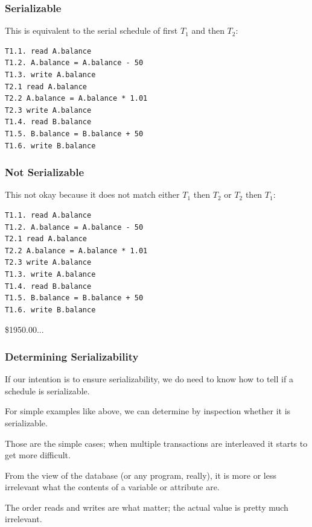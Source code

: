 \begin{frame}[fragile]
\frametitle{Serializable}

This is equivalent to the serial schedule of first $T_{1}$ and then $T_{2}$:

\begin{verbatim}
T1.1. read A.balance
T1.2. A.balance = A.balance - 50
T1.3. write A.balance
T2.1 read A.balance
T2.2 A.balance = A.balance * 1.01
T2.3 write A.balance
T1.4. read B.balance
T1.5. B.balance = B.balance + 50
T1.6. write B.balance
\end{verbatim}

\end{frame}

\begin{frame}[fragile]
\frametitle{Not Serializable}

This not okay because it does not match either $T_{1}$ then $T_{2}$ or $T_{2}$ then $T_{1}$:

\begin{verbatim}
T1.1. read A.balance
T1.2. A.balance = A.balance - 50
T2.1 read A.balance
T2.2 A.balance = A.balance * 1.01
T2.3 write A.balance
T1.3. write A.balance
T1.4. read B.balance
T1.5. B.balance = B.balance + 50
T1.6. write B.balance
\end{verbatim}

\$1950.00...

\end{frame}

\begin{frame}
\frametitle{Determining Serializability}


If our intention is to ensure serializability, we do need to know how to tell if a schedule is serializable. 

For simple examples like above, we can determine by inspection whether it is serializable.

Those are the simple cases; when multiple transactions are interleaved it starts to get more difficult.


From the view of the database (or any program, really), it is more or less irrelevant what the contents of a variable or attribute are. 

The order reads and writes are what matter; the actual value is pretty much irrelevant.

\end{frame}

